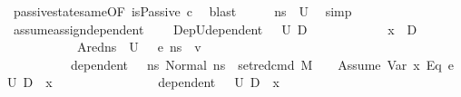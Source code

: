 \begin{isabellebody}
\ passive{\isacharunderscore}{\kern0pt}state{\isacharunderscore}{\kern0pt}same{\isacharbrackleft}{\kern0pt}OF\ {\isacartoucheopen}isPassive\ c{\isacartoucheclose}{\isacharbrackright}{\kern0pt}\ \isamarkupfalse%
\ blast\isanewline
\ \ \isamarkupfalse%
\ \isamarkupfalse%
\ {\isachardoublequoteopen}ns\ {\isasymin}\ U{\isachardoublequoteclose}\ \isamarkupfalse%
\ simp\isanewline
{}\isamarkupfalse%
%
\endisatagproof
{\isafoldproof}%
%
\isadelimproof
\isanewline
%
\endisadelimproof
\isanewline
{}\isamarkupfalse%
\ assume{\isacharunderscore}{\kern0pt}assign{\isacharunderscore}{\kern0pt}dependent{\isacharcolon}{\kern0pt}\isanewline
\ \ \ \ DepU{\isacharcolon}{\kern0pt}{\isachardoublequoteopen}dependent\ {\isasymLambda}\ {\isasymOmega}\ U\ D{\isachardoublequoteclose}\ \isanewline
\ \ \ \ \ \ \ \ \ \ \ {\isachardoublequoteopen}x\ {\isasymnotin}\ D{\isachardoublequoteclose}\ \isanewline
\ \ \ \ \ \ \ \ \ \ \ Ared{\isacharcolon}{\kern0pt}{\isachardoublequoteopen}{\isasymforall}ns{\isacharprime}{\kern0pt}\ {\isasymin}\ U{\isachardot}{\kern0pt}\ {\isasymLambda}{\isacharcomma}{\kern0pt}{\isasymGamma}{\isacharcomma}{\kern0pt}{\isasymOmega}\ {\isasymturnstile}\ {\isasymlangle}e{}{\isacharcomma}{\kern0pt}\ ns{\isacharprime}{\kern0pt}{\isasymrangle}\ {\isasymDown}\ v{\isachardoublequoteclose}\isanewline
\ \ \ \ \ \ \ \ \ \ {\isachardoublequoteopen}dependent\ {\isasymLambda}\ {\isasymOmega}\ {\isacharbraceleft}{\kern0pt}ns{\isacharprime}{\kern0pt}{\isachardot}{\kern0pt}\ Normal\ ns{\isacharprime}{\kern0pt}\ {\isasymin}\ {\isacharparenleft}{\kern0pt}set{\isacharunderscore}{\kern0pt}red{\isacharunderscore}{\kern0pt}cmd\ M\ {\isasymLambda}\ {\isasymGamma}\ {\isasymOmega}\ {\isacharparenleft}{\kern0pt}Assume\ {\isacharparenleft}{\kern0pt}{\isacharparenleft}{\kern0pt}Var\ x{\isacharparenright}{\kern0pt}\ {\isasymguillemotleft}Eq{\isasymguillemotright}\ e{}{\isacharparenright}{\kern0pt}{\isacharparenright}{\kern0pt}\ U{\isacharparenright}{\kern0pt}{\isacharbraceright}{\kern0pt}\ {\isacharparenleft}{\kern0pt}D\ {\isasymunion}\ {\isacharbraceleft}{\kern0pt}x{\isacharbraceright}{\kern0pt}{\isacharparenright}{\kern0pt}{\isachardoublequoteclose}\isanewline
\ \ \ \ \ \ \ \ \ \ \ \ \ \ \ {\isacharparenleft}{\kern0pt}\ {\isachardoublequoteopen}dependent\ {\isasymLambda}\ {\isasymOmega}\ {\isacharquery}{\kern0pt}U{\isacharprime}{\kern0pt}\ {\isacharparenleft}{\kern0pt}D\ {\isasymunion}\ {\isacharbraceleft}{\kern0pt}x{\isacharbraceright}{\kern0pt}{\isacharparenright}{\kern0pt}{\isachardoublequoteclose}{\isacharparenright}{\kern0pt}\isanewline

\end{isabellebody}
